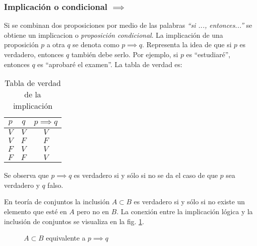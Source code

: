 \subsubsection{Implicación o condicional $\implies$}   \label{sec:condicional}
Si se combinan dos proposiciones por medio de las palabras \textit{``si ..., entonces...''} se obtiene un \gls{implicacion} o \textit{proposición condicional}. La implicación de una proposición $p$ a otra $q$ se denota como $p \implies q$. Representa la idea de que si $p$ es verdadero, entonces $q$ también debe serlo. Por ejemplo, si $p$ es ``estudiaré'', entonces $q$ es ``aprobaré el examen''. La tabla de verdad es:

\begin{table}[H]
	\centering
	\begin{tabular}{|c|c|c|} \hline
		$p$ & $q$ & $p \implies q$ \\ \hline
		$V$ & $V$ & $V$ \\
		$V$ & $F$ & $F$ \\
		$F$ & $V$ & $V$ \\
		$F$ & $F$ & $V$ \\ \hline
	\end{tabular}
	\caption{Tabla de verdad de la implicación}
	\label{tab:implicacion}
\end{table}

Se observa que $p \implies q$ es verdadero si y sólo si no se da el caso de que $p$ sea verdadero y $q$ falso.

En teoría de conjuntos la inclusión $A \subset B$ es verdadero si y sólo si no existe un elemento que esté en $A$ pero no en $B$. La conexión entre la implicación lógica y la inclusión de conjuntos se visualiza en la fig. \ref{fig:inclusion_logica}.

\begin{figure}[H]
	\centering
	\caption{$A \subset B$ equivalente a $p \implies q$}
	\label{fig:inclusion_logica}
\end{figure}

